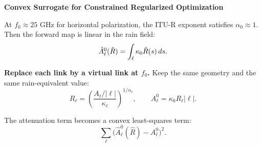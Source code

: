 \documentclass[aspectratio=169]{beamer}
\begin{document}

\begin{frame}[plain]
    \vspace{-0.5mm}
    \begin{center}\large\bfseries Convex Surrogate for Constrained Regularized Optimization
    \end{center}
    \vspace{4mm}

    At $f_0 \approx 25$ GHz for horizontal polarization, the ITU-R exponent satisfies
    $\alpha_0 \approx 1$. Then the forward map is linear in the rain field:
    \[
        \tikz[remember picture,baseline=(hatAzero.base)]
        \node[inner sep=0pt] (hatAzero) {$\hat A^0_\ell(\hat R)$};
        =
        \int_\ell \kappa_0 \hat R(s)\,ds .
    \]

    \vspace{2mm}
    \textbf{Replace each link by a virtual link at $f_0$.}
    Keep the same geometry and the same rain-equivalent value:
    \[
        R_\ell
        =
        \left(
        \frac{A_\ell/|\ell|}{\kappa_\ell}
        \right)^{1/\alpha_\ell},
        \qquad
        A^0_\ell
        =
        \kappa_0 R_\ell |\ell| .
    \]

    \vspace{2mm}
    The attenuation term becomes a convex least-squares term:
    \[
        \sum_\ell
        \bigl(\hat A^0_\ell(\hat R)-A^0_\ell\bigr)^2 .
    \]

\end{frame}
\end{document}
